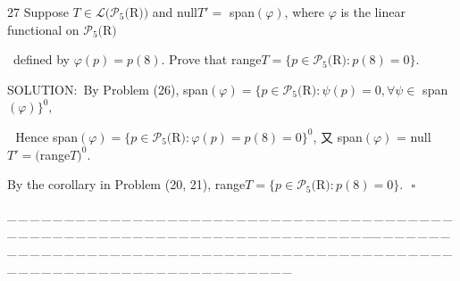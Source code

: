 \documentclass[a4paper, 11pt, UTF8]{article}
\def\Lm{\mathcal{L}}
\def\Po{\mathcal{P}}
\begin{document}
\begin{large}
{\timesbf\Large 27} {\timessl\Large 
Suppose $T\in\Lm(\Po_5(${\timesbf R}$))$ and null$T'=$ span$(\varphi)$, where $\varphi$ is the linear
functional on $\Po_5(${\timesbf R}$)$
}\par\quad\,
{\timessl\Large defined by $\varphi(p)=p(8)$. Prove that range$T=\{p\in \Po_5(${\timesbf R}$):p(8)=0\}.$
}\par
{\timesbf S{\small OLUTION:}}\,\,\,By Problem (26), span$(\varphi)=\{p\in\Po_5(${\timesbf R}$):\psi(p)=0,\forall \psi\in$ span$(\varphi)\}^0,$\par\qquad\qquad\qquad\qquad\quad\,\,
Hence span$(\varphi)=\{p\in\Po_5(${\timesbf R}$):\varphi(p)=p(8)=0\}^0$, 又\,\,span$(\varphi)$ = null$T'=($range$T)^0$.\par\quad By the corollary in Problem (20, 21), range$T=\{p\in\Po_5(${\timesbf R}$):p(8)=0\}.\,\,\,\,\square$\par
{\tiny \_\,\_\,\_\,\_\,\_\,\_\,\_\,\_\,\_\,\_\,\_\,\_\,\_\,\_\,\_\,\_\,\_\,\_\,\_\,\_\,\_\,\_\,\_\,\_\,\_\,\_\,\_\,\_\,\_\,\_\,\_\,\_\,\_\,\_\,\_\,\_\,\_\,\_\,\_\,\_\,\_\,\_\,\_\,\_\,\_\,\_\,\_\,\_\,\_\,\_\,\_\,\_\,\_\,\_\,\_\,\_\,\_\,\_\,\_\,\_\,\_\,\_\,\_\,\_\,\_\,\_\,\_\,\_\,\_\,\_\,\_\_\,\_\,\_\,\_\,\_\,\_\,\_\,\_\,\_\,\_\,\_\,\_\,\_\,\_\,\_\,\_\,\_\,\_\,\_\,\_\,\_\,\_\,\_\,\_\,\_\,\_\,\_\,\_\,\_\,\_\,\_\,\_\,\_\,\_\,\_\,\_\,\_\,\_\,\_\,\_\,\_\,\_\,\_\,\_\,\_\,\_\,\_\,\_\,\_\,\_\,\_\,\_\,\_\,\_\,\_\,\_\,\_\,\_\,\_\,\_\,\_\,\_\,\_\,\_\,\_\,\_\,\_\,\_\,\_\,\_\,\_}\par


\end{large}
\end{document}
